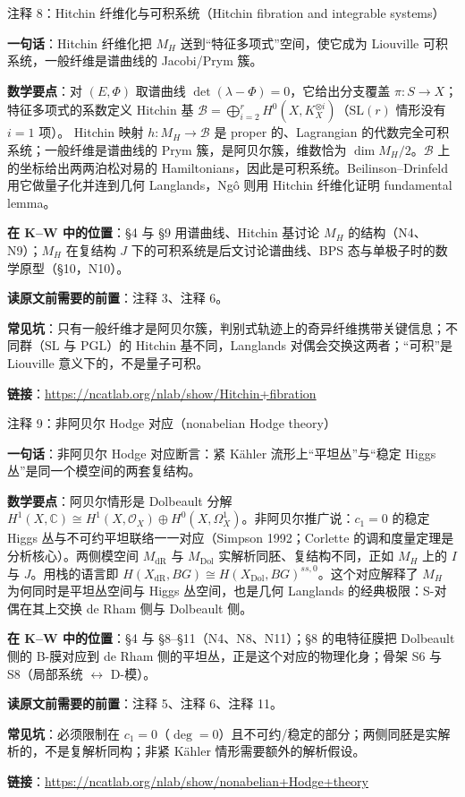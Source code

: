 \begin{kcard}{注释 8：Hitchin 纤维化与可积系统（Hitchin fibration and integrable systems）}

\textbf{一句话}：Hitchin 纤维化把 $M_H$ 送到“特征多项式”空间，使它成为 Liouville 可积系统，一般纤维是谱曲线的 Jacobi/Prym 簇。

\textbf{数学要点}：对 $(E,\Phi)$ 取谱曲线 $\det(\lambda-\Phi)=0$，它给出分支覆盖 $\pi:S\to X$；特征多项式的系数定义 Hitchin 基 $\mathcal{B}=\bigoplus_{i=2}^{r}H^0(X,K_X^{\otimes i})$（$\mathrm{SL}(r)$ 情形没有 $i=1$ 项）。 Hitchin 映射 $h:M_H\to\mathcal{B}$ 是 proper 的、Lagrangian 的代数完全可积系统；一般纤维是谱曲线的 Prym 簇，是阿贝尔簇，维数恰为 $\dim M_H/2$。$\mathcal{B}$ 上的坐标给出两两泊松对易的 Hamiltonians，因此是可积系统。Beilinson--Drinfeld 用它做量子化并连到几何 Langlands，Ngô 则用 Hitchin 纤维化证明 fundamental lemma。

\textbf{在 K--W 中的位置}：§4 与 §9 用谱曲线、Hitchin 基讨论 $M_H$ 的结构（N4、N9）；$M_H$ 在复结构 $J$ 下的可积系统是后文讨论谱曲线、BPS 态与单极子时的数学原型（§10，N10）。

\textbf{读原文前需要的前置}：注释 3、注释 6。

\textbf{常见坑}：只有一般纤维才是阿贝尔簇，判别式轨迹上的奇异纤维携带关键信息；不同群（$\mathrm{SL}$ 与 $\mathrm{PGL}$）的 Hitchin 基不同，Langlands 对偶会交换这两者；“可积”是 Liouville 意义下的，不是量子可积。

\noindent\textbf{链接}：\url{https://ncatlab.org/nlab/show/Hitchin+fibration}
\end{kcard}

\begin{kcard}{注释 9：非阿贝尔 Hodge 对应（nonabelian Hodge theory）}

\textbf{一句话}：非阿贝尔 Hodge 对应断言：紧 Kähler 流形上“平坦丛”与“稳定 Higgs 丛”是同一个模空间的两套复结构。

\textbf{数学要点}：阿贝尔情形是 Dolbeault 分解 $H^1(X,\mathbb{C})\cong H^1(X,\mathcal{O}_X)\oplus H^0(X,\Omega^1_X)$。非阿贝尔推广说：$c_1=0$ 的稳定 Higgs 丛与不可约平坦联络一一对应（Simpson 1992；Corlette 的调和度量定理是分析核心）。两侧模空间 $M_{\mathrm{dR}}$ 与 $M_{\mathrm{Dol}}$ 实解析同胚、复结构不同，正如 $M_H$ 上的 $I$ 与 $J$。用栈的语言即 $H(X_{\mathrm{dR}},BG)\cong H(X_{\mathrm{Dol}},BG)^{ss,0}$。这个对应解释了 $M_H$ 为何同时是平坦丛空间与 Higgs 丛空间，也是几何 Langlands 的经典极限：S-对偶在其上交换 de Rham 侧与 Dolbeault 侧。

\textbf{在 K--W 中的位置}：§4 与 §8--§11（N4、N8、N11）；§8 的电特征膜把 Dolbeault 侧的 B-膜对应到 de Rham 侧的平坦丛，正是这个对应的物理化身；骨架 S6 与 S8（局部系统 $\leftrightarrow$ D-模）。

\textbf{读原文前需要的前置}：注释 5、注释 6、注释 11。

\textbf{常见坑}：必须限制在 $c_1=0$（$\deg=0$）且不可约/稳定的部分；两侧同胚是实解析的，不是复解析同构；非紧 Kähler 情形需要额外的解析假设。

\noindent\textbf{链接}：\url{https://ncatlab.org/nlab/show/nonabelian+Hodge+theory}
\end{kcard}

